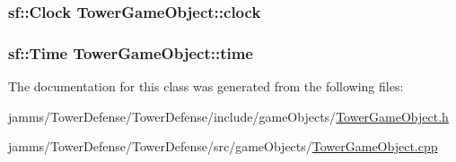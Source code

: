 \hypertarget{class_tower_game_object_a5c5f8162877828c20bf937c90338205c}{
\subsubsection[{clock}]{\setlength{\rightskip}{0pt plus 5cm}sf\+::\+Clock Tower\+Game\+Object\+::clock\hspace{0.3cm}{\ttfamily [protected]}}}\label{class_tower_game_object_a5c5f8162877828c20bf937c90338205c}
\hypertarget{class_tower_game_object_ade7e1ea2089b38f90fa3920a80a3619a}{
\subsubsection[{time}]{\setlength{\rightskip}{0pt plus 5cm}sf\+::\+Time Tower\+Game\+Object\+::time\hspace{0.3cm}{\ttfamily [protected]}}}\label{class_tower_game_object_ade7e1ea2089b38f90fa3920a80a3619a}


The documentation for this class was generated from the following files\+:\begin{DoxyCompactItemize}
\item 
jamms/\+Tower\+Defense/\+Tower\+Defense/include/game\+Objects/\hyperlink{_tower_game_object_8h}{Tower\+Game\+Object.\+h}\item 
jamms/\+Tower\+Defense/\+Tower\+Defense/src/game\+Objects/\hyperlink{_tower_game_object_8cpp}{Tower\+Game\+Object.\+cpp}\end{DoxyCompactItemize}
